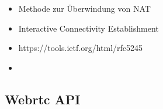 \begin{itemize}
	\item Methode zur Überwindung von NAT
	\item Interactive Connectivity Establishment
	\item https://tools.ietf.org/html/rfc5245
	\item 
\end{itemize}

\subsection{Webrtc API}
